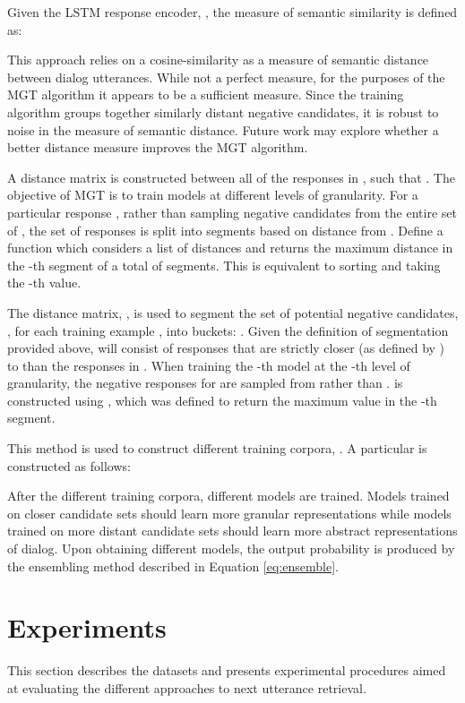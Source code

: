 \documentclass[11pt,a4paper]{article}
\begin{document}
Given the LSTM response encoder, , the measure of semantic similarity is defined as:



This approach relies on a cosine-similarity as a measure of semantic distance between dialog utterances. While not a perfect measure, for the purposes of the MGT algorithm it appears to be a sufficient measure. Since the training algorithm groups together similarly distant negative candidates, it is robust to noise in the measure of semantic distance. Future work may explore whether a better distance measure improves the MGT algorithm.

A distance matrix  is constructed between all of the responses in , such that . The objective of MGT is to train  models at  different levels of granularity. For a particular response , rather than sampling negative candidates from the entire set of , the set of responses  is split into  segments based on distance from . Define a function  which considers a list of distances and returns the maximum distance in the -th segment of a total of  segments. This is equivalent to sorting  and taking the -th value. 

The distance matrix, , is used to segment the set of potential negative candidates, , for each training example , into  buckets: . Given the definition of segmentation provided above,  will consist of responses that are strictly closer (as defined by ) to  than the responses in . When training the -th model at the -th level of granularity, the negative responses for  are sampled from  rather than .  is constructed using , which was defined to return the maximum value in the -th segment.

This method is used to construct  different training corpora, . A particular  is constructed as follows:



After the  different training corpora,  different models are trained. Models trained on closer candidate sets should learn more granular representations while models trained on more distant candidate sets should learn more abstract representations of dialog. Upon obtaining  different models, the output probability is produced by the ensembling method described in Equation \ref{eq:ensemble}.

\section{Experiments}

This section describes the datasets and presents experimental procedures aimed at evaluating the different approaches to next utterance retrieval. 
\end{document}
